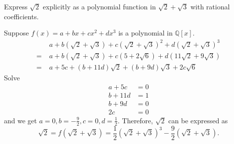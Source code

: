 \begin{problem}[1.23]
Express $\sqrt{2}$ explicitly as a polynomial function in $\sqrt{2}+\sqrt{3}$ with rational coefficients.
\end{problem}
\begin{solution}
	Suppose $f(x)=a+b x+c x^2+d x^3$ is a polynomial in $\mathbb{Q}[x]$.
	\begin{align*}
		&\;a+b\left(\sqrt{2}+\sqrt{3}\right)+c\left(\sqrt{2}+\sqrt{3}\right)^2+d\left(\sqrt{2}+\sqrt{3}\right)^3\\
		=&\;a+b\left(\sqrt{2}+\sqrt{3}\right)+c\left(5+2\sqrt{6}\right)+d\left(11\sqrt{2}+9\sqrt{3}\right)\\
		=&\;a+5c+(b+11d)\sqrt{2}+(b+9d)\sqrt{3}+2c \sqrt{6}
	\end{align*}
	Solve
	\begin{align*}
		a+5c&=0\\
		b+11d&=1\\
		b+9d&=0\\
		2c&=0
	\end{align*}
	and we get $a=0, b=-\frac{9}{2}, c=0, d=\frac{1}{2}$. Therefore, $\sqrt{2}$ can be expressed as
	\[
		\sqrt{2}=f\left(\sqrt{2}+\sqrt{3}\right)=\frac{1}{2}\left(\sqrt{2}+\sqrt{3}\right)^3-\frac{9}{2}\left(\sqrt{2}+\sqrt{3}\right)	.
	\]
\end{solution}

